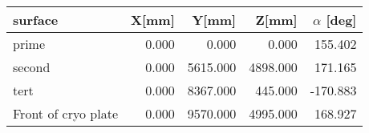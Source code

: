 \begin{tabular}{lrrrr}
\toprule
            surface &  X[mm] &    Y[mm] &    Z[mm] &  $\alpha$ [deg] \\
\midrule
              prime &  0.000 &    0.000 &    0.000 &      155.402 \\
             second &  0.000 & 5615.000 & 4898.000 &      171.165 \\
               tert &  0.000 & 8367.000 &  445.000 &     -170.883 \\
Front of cryo plate &  0.000 & 9570.000 & 4995.000 &      168.927 \\
\bottomrule
\end{tabular}
